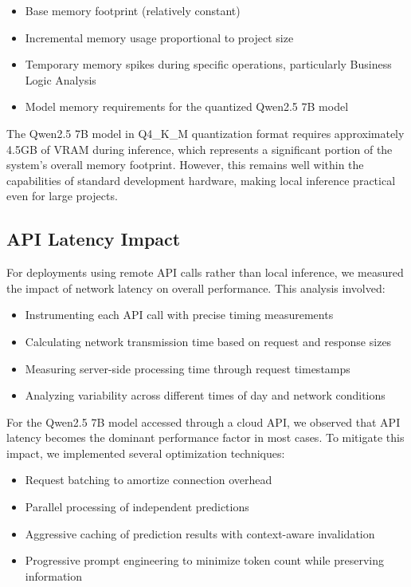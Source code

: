 \begin{itemize}
    \item Base memory footprint (relatively constant)
    \item Incremental memory usage proportional to project size
    \item Temporary memory spikes during specific operations, particularly Business Logic Analysis
    \item Model memory requirements for the quantized Qwen2.5 7B model
\end{itemize}

The Qwen2.5 7B model in Q4\_K\_M quantization format requires approximately 4.5GB of VRAM during inference, which represents a significant portion of the system's overall memory footprint. However, this remains well within the capabilities of standard development hardware, making local inference practical even for large projects.

\subsection{API Latency Impact}

For deployments using remote API calls rather than local inference, we measured the impact of network latency on overall performance. This analysis involved:

\begin{itemize}
    \item Instrumenting each API call with precise timing measurements
    \item Calculating network transmission time based on request and response sizes
    \item Measuring server-side processing time through request timestamps
    \item Analyzing variability across different times of day and network conditions
\end{itemize}

For the Qwen2.5 7B model accessed through a cloud API, we observed that API latency becomes the dominant performance factor in most cases. To mitigate this impact, we implemented several optimization techniques:

\begin{itemize}
    \item Request batching to amortize connection overhead
    \item Parallel processing of independent predictions
    \item Aggressive caching of prediction results with context-aware invalidation
    \item Progressive prompt engineering to minimize token count while preserving information
\end{itemize}

